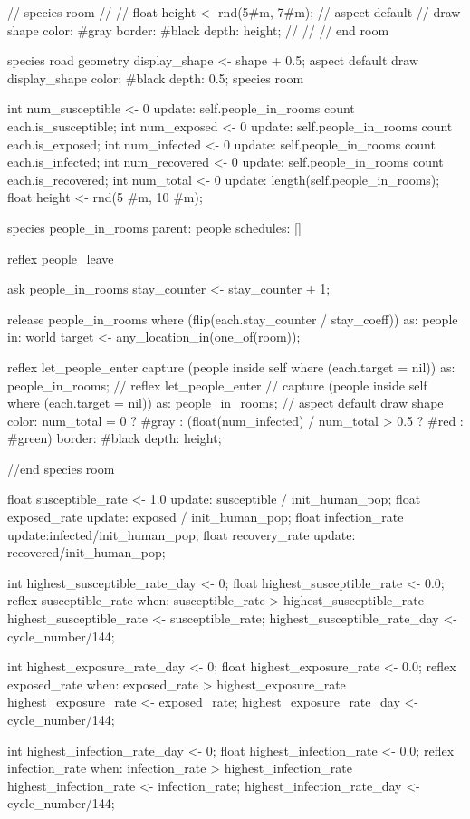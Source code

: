 \begin{verbatimtab}[4]
{//	species room{
//
//		float height <- rnd(5#m, 7#m);
//		aspect default{
//			draw shape color: #gray border: #black depth: height;
//		}
//	} // end room
	
	species road{
		geometry display_shape <- shape + 0.5;
		aspect default{
			draw display_shape color: #black depth: 0.5;
		}
	}
	species room{
		int num_susceptible <- 0 update: self.people_in_rooms count each.is_susceptible;
		int num_exposed <- 0 update: self.people_in_rooms count each.is_exposed;
		int num_infected <- 0 update: self.people_in_rooms count each.is_infected;
		int num_recovered <- 0 update: self.people_in_rooms count each.is_recovered;
		int num_total <- 0 update: length(self.people_in_rooms);
		float height <- rnd(5 #m, 10 #m);
		
		species people_in_rooms parent: people schedules: [] {
		}
		
		reflex people_leave {
		ask people_in_rooms {
			stay_counter <- stay_counter + 1;
		}

		release people_in_rooms where (flip(each.stay_counter / stay_coeff)) as: people in:
		 world {
			target <- any_location_in(one_of(room));
		}

	}
		reflex let_people_enter {
		capture (people inside self where (each.target = nil)) as: people_in_rooms;
	}
//		reflex let_people_enter {
//		capture (people inside self where (each.target = nil)) as: people_in_rooms;
//	}
	aspect default {
		draw shape color: num_total = 0 ? #gray : (float(num_infected) / num_total > 0.5 ?
		 #red : #green) border: #black depth: height;
	}
	}//end species room
	
	
	float susceptible_rate <- 1.0 update: susceptible / init_human_pop;
	float exposed_rate update: exposed / init_human_pop;
	float infection_rate update:infected/init_human_pop;
	float recovery_rate update: recovered/init_human_pop;
	
	int highest_susceptible_rate_day <- 0;
	float highest_susceptible_rate <- 0.0;
	reflex susceptible_rate when: susceptible_rate > highest_susceptible_rate{
		highest_susceptible_rate <- susceptible_rate;
		highest_susceptible_rate_day <- cycle_number/144;
	}	
	
	int highest_exposure_rate_day <- 0;
	float highest_exposure_rate <- 0.0;
	reflex exposed_rate when: exposed_rate > highest_exposure_rate{
		highest_exposure_rate <- exposed_rate;
		highest_exposure_rate_day <- cycle_number/144;
	}	
	
	
	int highest_infection_rate_day <- 0;
	float highest_infection_rate <- 0.0;
	reflex infection_rate when: infection_rate > highest_infection_rate{
		highest_infection_rate <- infection_rate;
		highest_infection_rate_day <- cycle_number/144;
	}
	
}
\end{verbatimtab}
